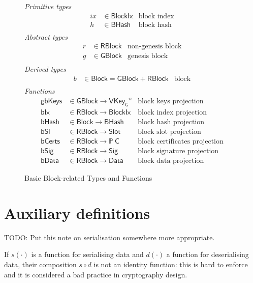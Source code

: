 \documentclass[11pt,a4paper]{article}
\newcommand{\powerset}[1]{\mathbb{P}~#1}
\newcommand{\fun}[1]{\mathsf{#1}}
\newcommand{\type}[1]{\mathsf{#1}}
\newcommand{\BHash}{\type{BHash}}  %
\newcommand{\Slot}{\type{Slot}}
\newcommand{\BlockIx}{\type{BlockIx}}
\newcommand{\GBlock}{\type{GBlock}}
\newcommand{\RBlock}{\type{RBlock}}
\newcommand{\Block}{\type{Block}}
\newcommand{\HCert}{\type{C}}
\newcommand{\VKeyGen}{\type{VKey_G}}
\newcommand{\Sig}{\type{Sig}}
\newcommand{\Data}{\type{Data}}
\newcommand{\hashname}{bHash}
\newcommand{\bdataname}{bData}
\newcommand{\bcertsname}{bCerts}
\newcommand{\bsigname}{bSig}
\newcommand{\bixname}{bIx}
\newcommand{\bslname}{bSl}
\newcommand{\totalf}{\to}
\begin{document}
\begin{figure}
  \emph{Primitive types}
  \begin{align*}
    ix & \in \BlockIx & \text{block index}\\
     h & \in \BHash   & \text{block hash}\\
  \end{align*}
  \emph{Abstract types}
  \begin{align*}
    r & \in \RBlock & \text{non-genesis block} \\
    g & \in \GBlock & \text{genesis block} \\
  \end{align*}
  \emph{Derived types}
  \begin{align*}
    b & \in \Block = \GBlock + \RBlock & \text{block} \\
  \end{align*}
  \emph{Functions}
  \begin{align*}
    \fun{gbKeys} & \in \GBlock \totalf \VKeyGen^n & \text{block keys projection} \\
    \fun{\bixname} & \in \RBlock \totalf \BlockIx & \text{block index projection} \\
    \fun{\hashname} & \in \Block \totalf \BHash
      & \text{block hash projection} \\
    \fun{\bslname} & \in \RBlock \totalf \Slot & \text{block slot projection} \\
    \fun{\bcertsname} & \in \RBlock \totalf \powerset{\HCert}
      & \text{block certificates projection} \\
    \fun{\bsigname} & \in \RBlock \totalf \Sig & \text{block signature projection} \\
    \fun{\bdataname} & \in \RBlock \totalf \Data & \text{block data projection}
  \end{align*}
  \caption{Basic Block-related Types and Functions}
  \label{fig:block-defs}
\end{figure}


\section{Auxiliary definitions}
\label{sec:auxil-defin}
TODO: Put this note on serialisation somewhere more appropriate.

If $s(\cdot)$ is a function for serialising data and $d(\cdot)$ a function for
deserialising data, their composition $s \circ d$ is not an identity function:
%
this is hard to enforce and it is considered a bad practice in cryptography
design.
\end{document}
